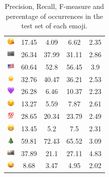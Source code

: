 \documentclass{article}
\begin{document}
\begin{table}
\begin{tabular}{|c|ccc|c|}
\includegraphics[height=0.37cm,width=0.37cm]{img/face_blowing_a_kiss.png} & 17.45 & 4.09 & 6.62 & 2.35\\ 
\includegraphics[height=0.37cm,width=0.37cm]{img/camera.png} & 26.34 & 37.99 & 31.11 & 2.86\\ 
\includegraphics[height=0.37cm,width=0.37cm]{img/United_States.png} & 60.64 & 52.8 & 56.45 & 3.9\\ 
\includegraphics[height=0.37cm,width=0.37cm]{img/sun.png} & 32.76 & 40.47 & 36.21 & 2.53\\ 
\includegraphics[height=0.37cm,width=0.37cm]{img/purple_heart.png} & 26.28 & 6.46 & 10.37 & 2.23\\ 
\includegraphics[height=0.37cm,width=0.37cm]{img/winking_face.png} & 13.27 & 5.59 & 7.87 & 2.61\\ 
\includegraphics[height=0.37cm,width=0.37cm]{img/hundred_points.png} & 28.65 & 20.34 & 23.79 & 2.49\\ 
\includegraphics[height=0.37cm,width=0.37cm]{img/beaming_face_with_smiling_eyes.png} & 13.45 & 5.2 & 7.5 & 2.31\\ 
\includegraphics[height=0.37cm,width=0.37cm]{img/Christmas_tree.png} & 59.81 & 72.43 & 65.52 & 3.09\\ 
\includegraphics[height=0.37cm,width=0.37cm]{img/camera_with_flash.png} & 37.89 & 21.1 & 27.11 & 4.83\\ 
\includegraphics[height=0.37cm,width=0.37cm]{img/winking_face_with_tongue.png} & 8.68 & 3.47 & 4.95 & 2.02\\ 

\hline
\end{tabular}
\caption{\label{table:emoji_detailed} Precision, Recall, F-measure and percentage of occurrences in the test set of each emoji.}
\end{table}
\end{document}
